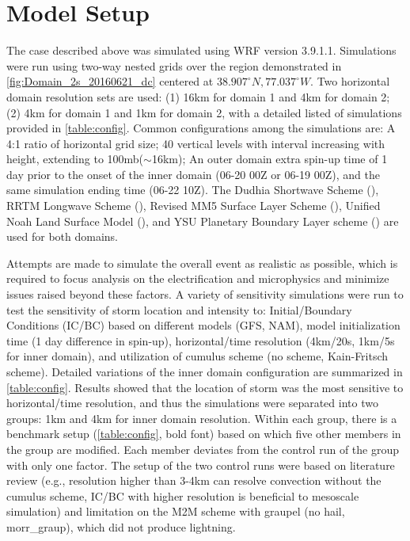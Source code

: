 \section{Model Setup}
 The case described above was simulated using WRF version 3.9.1.1. Simulations were run using two-way nested grids over the region demonstrated in \ref{fig:Domain_2s_20160621_dc} centered at $38.907^{\circ}N,77.037^{\circ}W$. Two horizontal domain resolution sets are used: (1) 16km for domain 1 and 4km for domain 2; (2) 4km for domain 1 and 1km for domain 2, with a detailed listed of simulations provided in \ref{table:config}. Common configurations among the simulations are: A 4:1 ratio of horizontal grid size; 40 vertical levels with interval increasing with height, extending to 100mb($\sim$16km); An outer domain extra spin-up time of 1 day prior to the onset of the inner domain (06-20 00Z or 06-19 00Z), and the same simulation ending time (06-22 10Z). The Dudhia Shortwave Scheme (\cite{dudhia1989numerical}), RRTM Longwave Scheme (\cite{mlawer1997radiative}), Revised MM5 Surface Layer Scheme (\cite{jimenez2012revised}), Unified Noah Land Surface Model (\cite{mukul2004implementation}), and YSU Planetary Boundary Layer scheme (\cite{hong2006new}) are used for both domains.
 
Attempts are made to simulate the overall event as realistic as possible, which is required to focus analysis on the electrification and microphysics and minimize issues raised beyond these factors. A variety of sensitivity simulations were run to test the sensitivity of storm location and intensity to: Initial/Boundary Conditions (IC/BC) based on different models (GFS, NAM), model initialization time (1 day difference in spin-up), horizontal/time resolution (4km/20s, 1km/5s for inner domain), and utilization of cumulus scheme (no scheme, Kain-Fritsch scheme). Detailed variations of the inner domain configuration are summarized in \ref{table:config}. Results showed that the location of storm was the most sensitive to horizontal/time resolution, and thus the simulations were separated into two groups: 1km and 4km for inner domain resolution. Within each group, there is a benchmark setup (\ref{table:config}, bold font) based on which five other members in the group are modified. Each member deviates from the control run of the group with only one factor. The setup of the two control runs were based on literature review (e.g., resolution higher than 3-4km can resolve convection without the cumulus scheme, IC/BC with higher resolution is beneficial to mesoscale simulation) and limitation on the M2M scheme with graupel (no hail, morr\_graup), which did not produce lightning.


